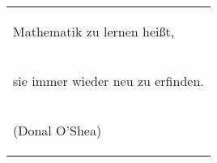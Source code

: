 \begin{table}[H]
  \centering
  \begin{tabular}{P{14cm}}
    \begin{LARGE}
		  \glqq Mathematik zu lernen heißt,
    \end{LARGE}\\
    \begin{LARGE}
		   sie immer wieder neu zu erfinden.\grqq
    \end{LARGE}\\
    \begin{large}
      (Donal O'Shea)
    \end{large}
  \end{tabular}
\end{table}